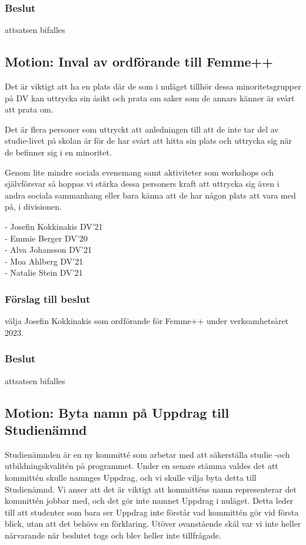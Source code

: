 \documentclass[protokoll]{dvd}
\begin{document}
\subsubsection*{Beslut}
\begin{attsatser}
    \item attsatsen bifalles
\end{attsatser}

\subsection{Motion: Inval av ordförande till Femme++}
Det är viktigt att ha en plats där de som i nuläget tillhör dessa minoritetsgrupper
på DV kan uttrycka sin åsikt och prata om saker som de annars känner är svårt att prata om.

Det är flera personer som uttryckt att anledningen till att de inte tar del av studie-livet
på skolan är för de har svårt att hitta sin plats och uttrycka sig när de befinner sig i en minoritet.

Genom lite mindre sociala evenemang samt aktiviteter som workshops och självförsvar så hoppas
vi stärka dessa personers kraft att uttrycka sig även i andra sociala sammanhang eller bara
känna att de har någon plats att vara med på, i divisionen.

- Josefin Kokkinakis DV'21 \\
- Emmie Berger DV'20 \\
- Alva Johansson DV'21 \\
- Moa Ahlberg DV'21 \\
- Natalie Stein DV'21
\subsubsection*{Förslag till beslut}
\begin{attsatser}
    \item välja Josefin Kokkinakis som ordförande för Femme++ under verksamhetsåret 2023.
\end{attsatser}
\subsubsection*{Beslut}
\begin{attsatser}
    \item attsatsen bifalles
\end{attsatser}

\subsection{Motion: Byta namn på Uppdrag till Studienämnd}
Studienämnden är en ny kommitté som arbetar med att säkerställa studie -och utbildningskvalitén på programmet. Under en senare stämma valdes det att kommittén skulle namnges Uppdrag, och vi skulle vilja byta detta till Studienämnd. Vi anser att det är viktigt att kommitténs namn representerar det kommittén jobbar med, och det gör inte namnet Uppdrag i nuläget. Detta leder till att studenter som bara ser Uppdrag inte förstår vad kommittén gör vid första blick,
utan att det behövs en förklaring. Utöver ovanstående skäl var vi inte heller närvarande när beslutet togs och blev heller inte tillfrågade.
\end{document}
